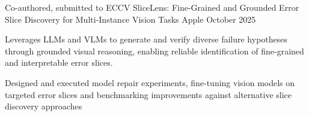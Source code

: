 \begin{cventries}
  
   \cventry
    {Co-authored, submitted to ECCV}
    {SliceLens: Fine-Grained and Grounded Error Slice Discovery for Multi-Instance Vision Tasks}
    {Apple}
    {October 2025}
    {
      \begin{cvitems}
        \item {Leverages LLMs and VLMs to generate and verify diverse failure hypotheses through grounded visual reasoning, enabling reliable identification of fine-grained and interpretable error slices.}
        \item {Designed and executed model repair experiments, fine-tuning vision models on targeted error slices and benchmarking improvements against alternative slice discovery approaches}
      \end{cvitems}
    }
    

  
   
\end{cventries}
